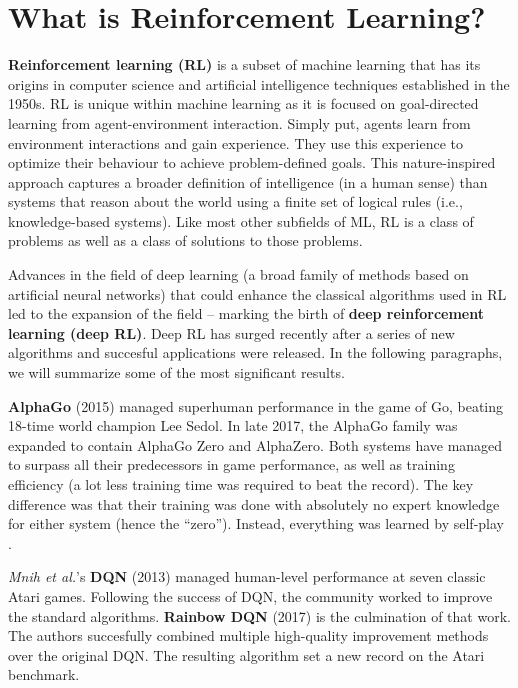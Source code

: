 \section{What is Reinforcement Learning?}

\textbf{Reinforcement learning (RL)} is a subset of machine learning that has its origins in computer science and artificial intelligence techniques established in the 1950s.
RL is unique within machine learning as it is focused on goal-directed learning from agent-environment interaction\cite{rlai}.
Simply put, agents learn from environment interactions and gain experience.
They use this experience to optimize their behaviour to achieve problem-defined goals.
This nature-inspired approach captures a broader definition of intelligence (in a human sense) than systems that reason about the world using a finite set of logical rules (i.e., knowledge-based systems).
Like most other subfields of ML, RL is a class of problems as well as a class of solutions to those problems\cite{rlai}.

Advances in the field of deep learning (a broad family of methods based on artificial neural networks\cite{wiki:Deep_learning}) that could enhance the classical algorithms used in RL led to the expansion of the field -- marking the birth of \textbf{deep reinforcement learning (deep RL)}.
Deep RL has surged recently after a series of new algorithms and succesful applications were released. In the following paragraphs, we will summarize some of the most significant results.

\textbf{AlphaGo} (2015)\cite{ago} managed superhuman performance in the game of Go, beating 18-time world champion Lee Sedol.
In late 2017, the AlphaGo family was expanded to contain AlphaGo Zero and AlphaZero\cite{azero}.
Both systems have managed to surpass all their predecessors in game performance, as well as training efficiency \cite{wiki:AlphaGo} (a lot less training time was required to beat the record).
The key difference was that their training was done with absolutely no expert knowledge for either system (hence the ``zero'').
Instead, everything was learned by self-play \cite{azero}.

\textit{Mnih et al.}'s \textbf{DQN}\cite{atari-dqn} (2013) managed human-level performance at seven classic Atari games.
Following the success of DQN, the community worked to improve the standard algorithms.
\textbf{Rainbow DQN} (2017)\cite{rainbow-dqn} is the culmination of that work.
The authors succesfully combined multiple high-quality improvement methods over the original DQN.
The resulting algorithm set a new record on the Atari benchmark.

